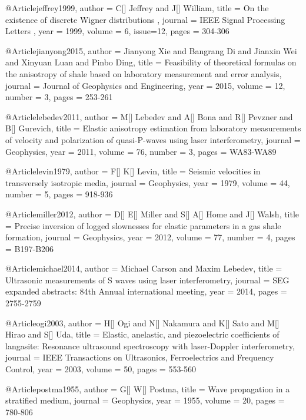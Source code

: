 @Article{jeffrey1999,
  author = 	 {C[] Jeffrey and J[] William},
  title = 	 { On the existence of discrete Wigner distributions },
  journal = 	 { IEEE Signal Processing Letters },
  year = 	 1999,
  volume = 	 6,
  issue=12,
  pages = 	 {304-306}
}

@Article{jianyong2015,
  author = 	 {Jianyong Xie and Bangrang Di and Jianxin Wei and Xinyuan Luan and Pinbo Ding},
  title = 	 {Feasibility of theoretical formulas on the anisotropy of shale based on laboratory measurement and error analysis},
  journal = 	 {Journal of Geophysics and Engineering},
  year = 	 2015,
  volume = 	 12,
  number = 	 3,
  pages = 	 {253-261}}

@Article{lebedev2011,
  author = 	 {M[] Lebedev and A[] Bona and R[] Pevzner and B[] Gurevich},
  title = 	 {Elastic anisotropy estimation from laboratory measurements of velocity and polarization of quasi-P-waves using laser interferometry},
  journal = 	 {Geophysics},
  year = 	 2011,
  volume = 	 76,
  number = 	 3,
  pages = 	 {WA83-WA89}}

@Article{levin1979,
  author = 	 {F[] K[] Levin},
  title = 	 {Seismic velocities in transversely isotropic media},
  journal = 	 {Geophysics},
  year = 	 1979,
  volume = 	 44,
  number = 	 5,
  pages = 	 {918-936}}

@Article{miller2012,
  author = 	 {D[] E[] Miller and S[] A[] Home and J[] Walsh},
  title = 	 {Precise inversion of logged slownesses for elastic parameters in a gas shale formation},
  journal = 	 {Geophysics},
  year = 	 2012,
  volume = 	 77,
  number = 	 4,
  pages = 	 {B197-B206}}

@Article{michael2014,
  author = 	 {Michael Carson and Maxim Lebedev},
  title = 	 {Ultrasonic measurements of S waves using laser interferometry},
  journal = 	 {SEG expanded abstracts: 84th Annual international meeting},
  year = 	 2014,
  pages = 	 {2755-2759}}

@Article{ogi2003,
  author = 	 {H[] Ogi and N[] Nakamura and K[] Sato and M[] Hirao and S[] Uda},
  title = 	 {Elastic, anelastic, and piezoelectric coefficients of langasite: Resonance ultrasound spectroscopy with laser-Doppler interferometry},
  journal = 	 {IEEE Transactions on Ultrasonics, Ferroelectrics and Frequency Control},
  year = 	 2003,
  volume = 	 50,
  pages = 	 {553-560}}

@Article{postma1955,
  author = 	 {G[] W[] Postma},
  title = 	 {Wave propagation in a stratified medium},
  journal = 	 {Geophysics},
  year = 	 1955,
  volume = 	 20,
  pages = 	 {780-806}}

